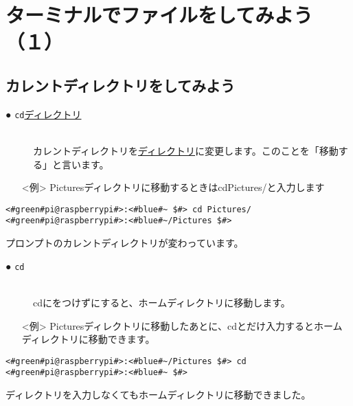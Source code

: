 \newpage
\section{ターミナルでファイルをしてみよう（１）}

\subsection{カレントディレクトリをしてみよう}
\begin{description}
\item[● \texttt{cd}\textvisiblespace \underline{ディレクトリ}]\mbox{}\\
カレントディレクトリを\underline{ディレクトリ}に変更します。このことを「移動する」と言います。
\end{description}
\begin{itemize}
\item[<例>] Picturesディレクトリに移動するときはcd\textvisiblespace Pictures/と入力します
\end{itemize}

\begin{lstlisting}[caption=cd directoryの例, label=cdDir]
<#green#pi@raspberrypi#>:<#blue#~ $#> cd Pictures/
<#green#pi@raspberrypi#>:<#blue#~/Pictures $#>
\end{lstlisting}
プロンプトのカレントディレクトリが変わっています。

\begin{description}
\item[● \texttt{cd}]\mbox{}\\
cdにをつけずにすると、ホームディレクトリに移動します。
\end{description}
\begin{itemize}
\item[<例>] Picturesディレクトリに移動したあとに、cdとだけ入力するとホームディレクトリに移動できます。
\end{itemize}
\begin{lstlisting}[caption=cdの例, label=cd]
<#green#pi@raspberrypi#>:<#blue#~/Pictures $#> cd
<#green#pi@raspberrypi#>:<#blue#~ $#> 
\end{lstlisting}
ディレクトリを入力しなくてもホームディレクトリに移動できました。\\


